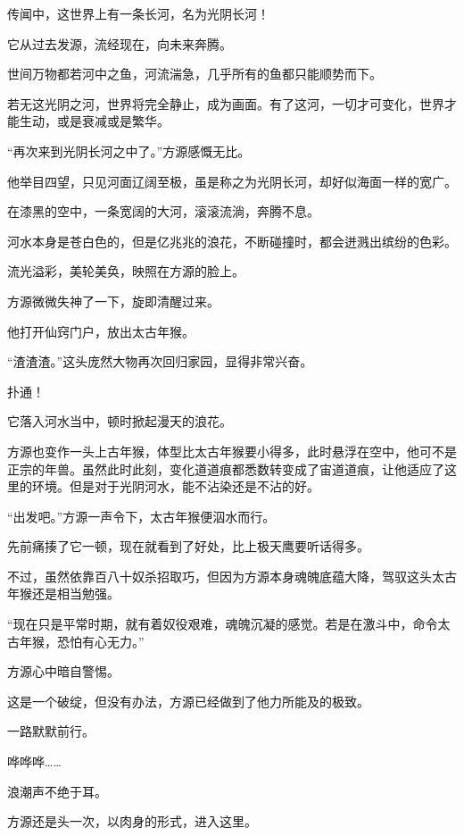 
\begin{this_body}

传闻中，这世界上有一条长河，名为光阴长河！

它从过去发源，流经现在，向未来奔腾。

世间万物都若河中之鱼，河流湍急，几乎所有的鱼都只能顺势而下。

若无这光阴之河，世界将完全静止，成为画面。有了这河，一切才可变化，世界才能生动，或是衰减或是繁华。

“再次来到光阴长河之中了。”方源感慨无比。

他举目四望，只见河面辽阔至极，虽是称之为光阴长河，却好似海面一样的宽广。

在漆黑的空中，一条宽阔的大河，滚滚流淌，奔腾不息。

河水本身是苍白色的，但是亿兆兆的浪花，不断碰撞时，都会迸溅出缤纷的色彩。

流光溢彩，美轮美奂，映照在方源的脸上。

方源微微失神了一下，旋即清醒过来。

他打开仙窍门户，放出太古年猴。

“渣渣渣。”这头庞然大物再次回归家园，显得非常兴奋。

扑通！

它落入河水当中，顿时掀起漫天的浪花。

方源也变作一头上古年猴，体型比太古年猴要小得多，此时悬浮在空中，他可不是正宗的年兽。虽然此时此刻，变化道道痕都悉数转变成了宙道道痕，让他适应了这里的环境。但是对于光阴河水，能不沾染还是不沾的好。

“出发吧。”方源一声令下，太古年猴便泅水而行。

先前痛揍了它一顿，现在就看到了好处，比上极天鹰要听话得多。

不过，虽然依靠百八十奴杀招取巧，但因为方源本身魂魄底蕴大降，驾驭这头太古年猴还是相当勉强。

“现在只是平常时期，就有着奴役艰难，魂魄沉凝的感觉。若是在激斗中，命令太古年猴，恐怕有心无力。”

方源心中暗自警惕。

这是一个破绽，但没有办法，方源已经做到了他力所能及的极致。

一路默默前行。

哗哗哗……

浪潮声不绝于耳。

方源还是头一次，以肉身的形式，进入这里。


\end{this_body}
